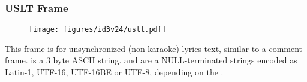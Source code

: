 \clearpage

\subsubsection{USLT Frame}
\begin{figure}[h]
  \texttt{[image: figures/id3v24/uslt.pdf]}
\end{figure}
\par
\noindent
This frame is for unsynchronized (non-karaoke) lyrics text,
similar to a comment frame.
 is a 3 byte ASCII string.
 and  are a NULL-terminated strings
encoded as Latin-1, UTF-16, UTF-16BE or UTF-8,
depending on the .
